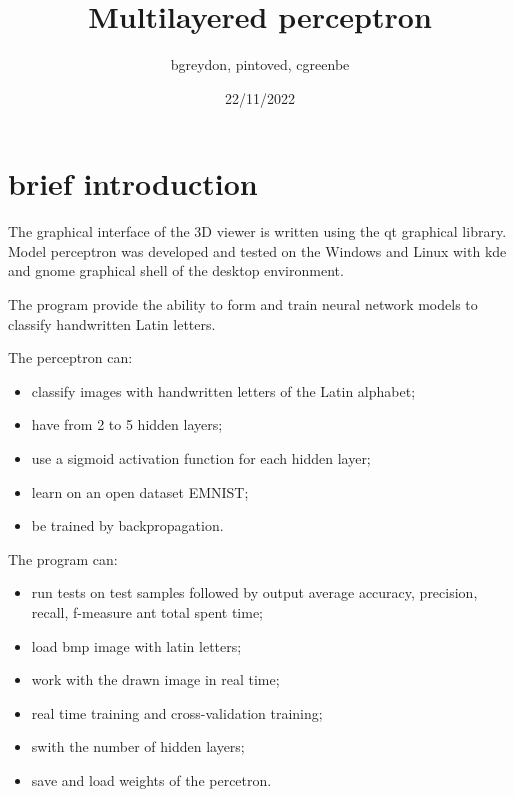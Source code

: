 \documentclass[12pt]{article}
\title{Multilayered perceptron}
\author{bgreydon, pintoved, cgreenbe}
\date{22/11/2022}
\begin{document}
\maketitle

\newpage
\section{brief introduction}
The graphical interface of the 3D viewer is written using the qt graphical library.
Model perceptron was developed and tested on the Windows and Linux with kde and gnome graphical shell of the desktop environment.

The program provide the ability to form and train neural network models to classify handwritten Latin letters.

The perceptron can:
\begin{itemize}
  \item classify images with handwritten letters of the Latin alphabet;
  \item have from 2 to 5 hidden layers;
  \item use a sigmoid activation function for each hidden layer;
  \item learn on an open dataset EMNIST;
  \item be trained by backpropagation.
\end{itemize}

The program can:
\begin{itemize}
  \item run tests on test samples followed by output average accuracy, precision, recall, f-measure ant total spent time;
  \item load bmp image with latin letters;
  \item work with the drawn image in real time;
  \item real time training and cross-validation training;
  \item swith the number of hidden layers;
  \item save and load weights of the percetron.
\end{itemize}
\end{document}
